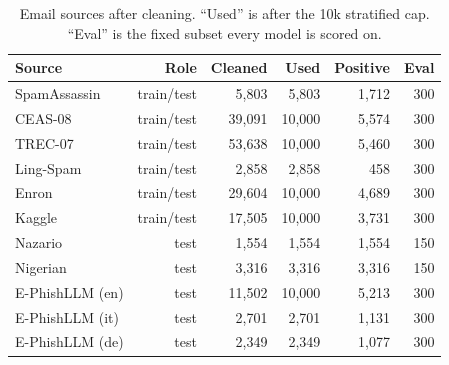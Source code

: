 \begin{table}[t]
\caption{Email sources after cleaning. ``Used'' is after the 10k stratified cap. ``Eval'' is the fixed subset every model is scored on.}
\label{tab:data}
\centering\footnotesize
\setlength{\tabcolsep}{3pt}
\begin{tabular}{lrrrrr}
\toprule
Source & Role & Cleaned & Used & Positive & Eval \\
\midrule
SpamAssassin & train/test & 5,803 & 5,803 & 1,712 & 300 \\
CEAS-08 & train/test & 39,091 & 10,000 & 5,574 & 300 \\
TREC-07 & train/test & 53,638 & 10,000 & 5,460 & 300 \\
Ling-Spam & train/test & 2,858 & 2,858 & 458 & 300 \\
Enron & train/test & 29,604 & 10,000 & 4,689 & 300 \\
Kaggle & train/test & 17,505 & 10,000 & 3,731 & 300 \\
Nazario & test & 1,554 & 1,554 & 1,554 & 150 \\
Nigerian & test & 3,316 & 3,316 & 3,316 & 150 \\
E-PhishLLM (en) & test & 11,502 & 10,000 & 5,213 & 300 \\
E-PhishLLM (it) & test & 2,701 & 2,701 & 1,131 & 300 \\
E-PhishLLM (de) & test & 2,349 & 2,349 & 1,077 & 300 \\
\bottomrule
\end{tabular}
\end{table}
